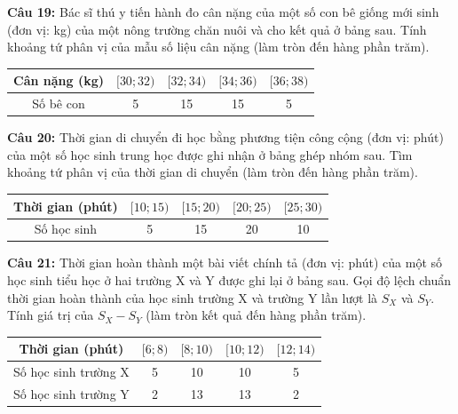 \documentclass[12pt]{article}
\begin{document}
	\noindent \textbf{Câu 19:} Bác sĩ thú y tiến hành đo cân nặng của một số con bê giống mới sinh (đơn vị: kg) của một nông trường chăn nuôi và cho kết quả ở bảng sau. Tính khoảng tứ phân vị của mẫu số liệu cân nặng (làm tròn đến hàng phần trăm).
	\begin{center}
		\renewcommand{\arraystretch}{1.3}
		\begin{tabular}{|c|c|c|c|c|}
			\hline
			Cân nặng (kg) & $[30; 32)$ & $[32; 34)$ & $[34; 36)$ & $[36; 38)$ \\
			\hline
			Số bê con & 5 & 15 & 15 & 5 \\
			\hline
		\end{tabular}
	\end{center}
	
	\vspace{4mm}
	
	\noindent \textbf{Câu 20:} Thời gian di chuyển đi học bằng phương tiện công cộng (đơn vị: phút) của một số học sinh trung học được ghi nhận ở bảng ghép nhóm sau. Tìm khoảng tứ phân vị của thời gian di chuyển (làm tròn đến hàng phần trăm).
	\begin{center}
		\renewcommand{\arraystretch}{1.3}
		\begin{tabular}{|c|c|c|c|c|}
			\hline
			Thời gian (phút) & $[10; 15)$ & $[15; 20)$ & $[20; 25)$ & $[25; 30)$ \\
			\hline
			Số học sinh & 5 & 15 & 20 & 10 \\
			\hline
		\end{tabular}
	\end{center}
	
	\noindent \textbf{Câu 21:} Thời gian hoàn thành một bài viết chính tả (đơn vị: phút) của một số học sinh tiểu học ở hai trường X và Y được ghi lại ở bảng sau. Gọi độ lệch chuẩn thời gian hoàn thành của học sinh trường X và trường Y lần lượt là $S_X$ và $S_Y$. Tính giá trị của $S_X - S_Y$ (làm tròn kết quả đến hàng phần trăm).
	\begin{center}
		\renewcommand{\arraystretch}{1.3}
		\begin{tabular}{|c|c|c|c|c|}
			\hline
			Thời gian (phút) & $[6; 8)$ & $[8; 10)$ & $[10; 12)$ & $[12; 14)$ \\
			\hline
			Số học sinh trường X & 5 & 10 & 10 & 5 \\
			\hline
			Số học sinh trường Y & 2 & 13 & 13 & 2 \\
			\hline
		\end{tabular}
	\end{center}
	
\end{document}
